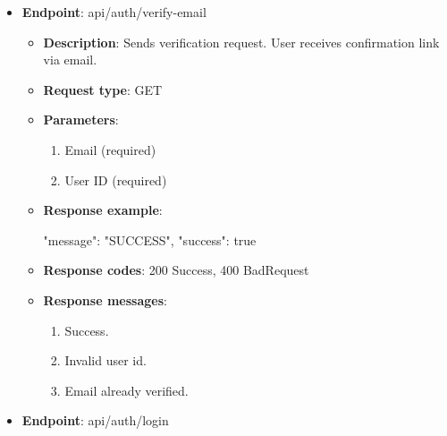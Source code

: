 \begin{itemize}
    \item \textbf{Endpoint}: api/auth/verify-email

    \begin{itemize}
        \item \textbf{Description}: Sends verification request.
        User receives confirmation link via email.
        \item \textbf{Request type}: GET
        \item \textbf{Parameters}:
        \begin{enumerate}
            \item Email (required)
            \item User ID (required)
        \end{enumerate}
        \item \textbf{Response example}:
        \begin{spverbatim}
        {
            "message": "SUCCESS",
            "success": true
        }
        \end{spverbatim}
        \item \textbf{Response codes}: 200 Success, 400 BadRequest
        \item \textbf{Response messages}:
        \begin{enumerate}
            \item Success.
            \item Invalid user id.
            \item Email already verified.
        \end{enumerate}
    \end{itemize}

    \item \textbf{Endpoint}: api/auth/login


\end{itemize}

